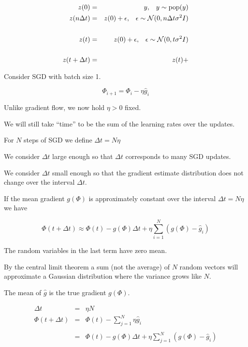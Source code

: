 {

\begin{eqnarray*}
  z(0) & = & y,\;\;\;y \sim \mathrm{pop}(y) \nonumber \\
  z(n\Delta t) & = & z(0) + \epsilon,\;\;\;\epsilon \sim {\cal N}(0,n\Delta t\sigma^2I) \\
  \\
  z(t) & = & z(0) + \epsilon,\;\;\;\epsilon \sim {\cal N}(0,t\sigma^2I) \\
  \\
  z(t+ \Delta t) & = & z(t) + 
\end{eqnarray*}






\vfill
Consider SGD with batch size 1.

$$\Phi_{i+1} = \Phi_i - \eta\hat{g}_i$$

\vfill
Unlike gradient flow, we now hold $\eta > 0$ fixed.

\vfill
We will still take ``time'' to be the sum of the learning rates over the updates.

\vfill
For $N$ steps of SGD we define $\Delta t = N \eta$


We consider $\Delta t$ large enough so that $\Delta t$ corresponds to many SGD updates.

\vfill
We consider $\Delta t$ small enough so that the gradient estimate distribution does not change over the interval $\Delta t$.


If the mean gradient $g(\Phi)$ is approximately constant over the interval $\Delta t = N \eta$ we have

$$\Phi(t + \Delta t)  \approx \Phi(t) -g(\Phi)\Delta t + \eta \sum_{i=1}^N (g(\Phi) - \hat{g}_i)$$

\vfill
The random variables in the last term have zero mean.

\vfill
By the central limit theorem a sum (not the average) of $N$ random vectors will approximate a Gaussian distribution where the variance
grows like $N$.


The mean of $\hat{g}$ is the true gradient $g(\Phi)$.  

\begin{eqnarray*}
\Delta t & = & \eta N \\
\Phi(t + \Delta t) &  = & \Phi(t) - \sum_{j=1}^N \eta\hat{g}_i \\
\\
 &  = & \Phi(t) -g(\Phi)\Delta t + \eta \sum_{j=1}^N (g(\Phi) - \hat{g}_i)
\end{eqnarray*}

}
